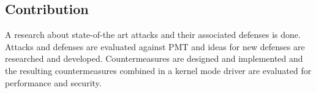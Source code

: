 \subsection{Contribution}
A research about state-of-the art attacks and their associated defenses is done. Attacks and defenses are evaluated against \gls{PMT} and ideas for new defenses are researched and developed. Countermeasures are designed and implemented and the resulting countermeasures combined in a kernel mode driver are evaluated for performance and security.